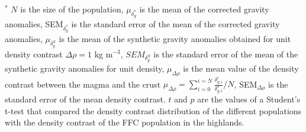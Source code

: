 \begin{table}[h!]
{\begin{tabular}
{\begin{minipage}{18cm}
                                    \vspace{.1cm}  \footnotesize  $^*$
                                    $N$ is the size of the population,
                                    $\mu_{\delta_g^*}$ is  the mean of
                                    the  corrected gravity  anomalies,
                                    SEM$_{\delta_g^*}$ is the standard
                                    error of the mean of the corrected
                                    gravity                 anomalies,
                                    $\mu_{\delta_g^S}$ is  the mean of
                                    the  synthetic  gravity  anomalies
                                    obtained for unit density contrast
                                    $\Delta  \rho  = 1$  kg  m$^{-3}$,
                                    $SEM_{\delta_g^S}$ is the standard
                                    error of the mean of the synthetic
                                    gravity    anomalies   for    unit
                                    density,  $\mu_{\Delta  \rho}$  is
                                    the  mean  value  of  the  density
                                    contrast between the magma and the
                                    crust
                                    $\mu_{\Delta                \rho}=
                                    \sum_{i=0}^{i=N}
                                    \frac{\delta_{g;i}^{c}}{\delta_{g;i}^{s}}/N$,
                                    SEM$_{\Delta   {\rho}}$   is   the
                                    standard error of the mean density
                                    contrast.   $t$  and $p$  are  the
                                    values of a  Student's t-test that
                                    compared   the  density   contrast
                                    distribution   of  the   different
                                    populations   with   the   density
                                    contrast of the  FFC population in
                                    the highlands.
                                  \end{minipage}
                                  }\\

                                \end{tabular}}
                                \label{Table4-3}
                              \end{table}
                            

